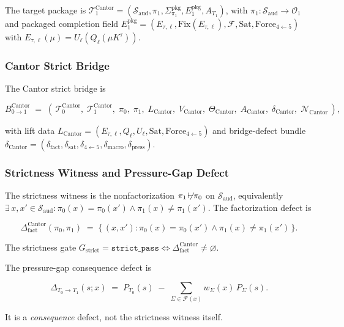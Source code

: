 \documentclass[11pt]{article}
\providecommand{\factor}{\mathrel{\!\vdash\!}}
\theoremstyle{definition}
\begin{document}
The target package is \(\mathcal T_{1}^{\mathrm{Cantor}}=(\mathcal S_{\mathrm{aud}},\pi_{1},\Sigma_{\pi_{1}}^{\mathrm{pkg}},E_{1}^{\mathrm{pkg}},A_{T_{1}})\), with \(\pi_{1}:\mathcal S_{\mathrm{aud}}\to\mathcal O_{1}\) and packaged completion field \(E_{1}^{\mathrm{pkg}}=(E_{\tau,\ell},\mathrm{Fix}(E_{\tau,\ell}),\mathcal F,\mathrm{Sat},\mathrm{Force}_{4\leftarrow 5})\) with \(E_{\tau,\ell}(\mu)=U_{\ell}(Q_{\ell}(\mu K^{\tau}))\).

\subsubsection{Cantor Strict Bridge}

The Cantor strict bridge is

\[
B_{0\to 1}^{\mathrm{Cantor}}\;=\;(\,\mathcal T_{0}^{\mathrm{Cantor}},\;\mathcal T_{1}^{\mathrm{Cantor}},\;\pi_{0},\;\pi_{1},\;L_{\mathrm{Cantor}},\;V_{\mathrm{Cantor}},\;\Theta_{\mathrm{Cantor}},\;A_{\mathrm{Cantor}},\;\delta_{\mathrm{Cantor}},\;\mathcal N_{\mathrm{Cantor}}\,),
\]

with lift data \(L_{\mathrm{Cantor}}=(E_{\tau,\ell},Q_{\ell},U_{\ell},\mathrm{Sat},\mathrm{Force}_{4\leftarrow 5})\) and bridge-defect bundle \(\delta_{\mathrm{Cantor}}=(\delta_{\mathrm{fact}},\delta_{\mathrm{sat}},\delta_{4\leftarrow 5},\delta_{\mathrm{macro}},\delta_{\mathrm{press}})\).

\subsubsection{Strictness Witness and Pressure-Gap Defect}

The strictness witness is the nonfactorization \(\pi_{1}\not\factor\pi_{0}\) on \(\mathcal S_{\mathrm{aud}}\), equivalently \(\exists\,x,x'\in\mathcal S_{\mathrm{aud}}:\pi_{0}(x)=\pi_{0}(x')\land\pi_{1}(x)\neq\pi_{1}(x')\). The factorization defect is

\[
\Delta_{\mathrm{fact}}^{\mathrm{Cantor}}(\pi_{0},\pi_{1})\;=\;\{\,(x,x'):\pi_{0}(x)=\pi_{0}(x')\land\pi_{1}(x)\neq\pi_{1}(x')\,\}.
\]

The strictness gate \(G_{\mathrm{strict}}=\texttt{strict\_pass}\Leftrightarrow\Delta_{\mathrm{fact}}^{\mathrm{Cantor}}\neq\varnothing\).

The pressure-gap consequence defect is

\[
\Delta_{T_{0}\to T_{1}}(s;x)\;=\;P_{T_{0}}(s)\;-\;\sum_{\Sigma\in\mathcal F(x)}w_{\Sigma}(x)\,P_{\Sigma}(s).
\]

It is a \emph{consequence} defect, not the strictness witness itself.
\end{document}
